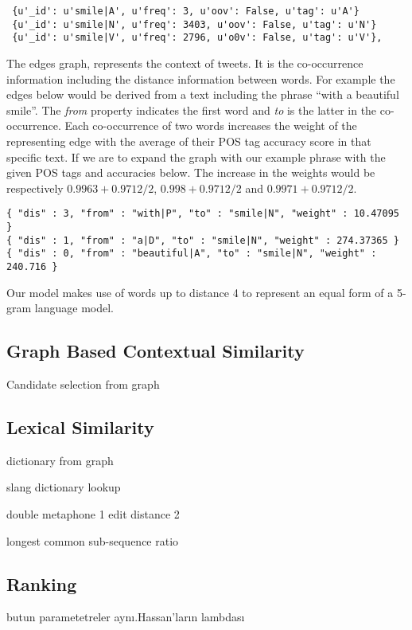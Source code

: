 \begin{verbatim}
 {u'_id': u'smile|A', u'freq': 3, u'oov': False, u'tag': u'A'}
 {u'_id': u'smile|N', u'freq': 3403, u'oov': False, u'tag': u'N'}
 {u'_id': u'smile|V', u'freq': 2796, u'o0v': False, u'tag': u'V'},
\end{verbatim}

The edges graph, represents the context of tweets. It is the co-occurrence information including the distance information between words. For example the edges below would be derived from a text including the phrase ``with a beautiful smile''. The \textit{from} property indicates the first word and \textit{to} is the latter in the co-occurrence. Each co-occurrence of two words increases the weight of the representing edge with the average of their POS tag accuracy score in that specific text. If we are to expand the graph with our example phrase with the given POS tags and accuracies below. The increase in the weights would be respectively $0.9963+0.9712/2$, $0.998+0.9712/2$ and $0.9971+0.9712/2$.

\begin{verbatim}
{ "dis" : 3, "from" : "with|P", "to" : "smile|N", "weight" : 10.47095 }
{ "dis" : 1, "from" : "a|D", "to" : "smile|N", "weight" : 274.37365 }
{ "dis" : 0, "from" : "beautiful|A", "to" : "smile|N", "weight" : 240.716 }
\end{verbatim}



Our model makes use of words up to distance 4 to represent an equal form of a 5-gram language model.


\subsection{Graph Based Contextual Similarity}


Candidate selection from graph

\subsection{Lexical Similarity}

dictionary from graph

slang dictionary lookup

double metaphone 1
edit distance 2


longest common sub-sequence ratio



\subsection{Ranking}

butun parametetreler aynı.Hassan'ların lambdası
